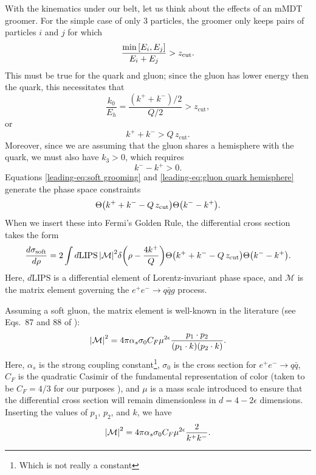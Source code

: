 \documentclass[../thesis.tex]{subfiles}
\providecommand{\zcut}{z_\mathrm{{cut}}}
\providecommand{\LIPS}{\mathrm{LIPS}}
\providecommand{\cM}{\mathcal{M}}
\begin{document}
	With the kinematics under our belt, let us think about the effects of an mMDT groomer. For the simple case of only 3 particles, the groomer only keeps pairs of particles $i$ and $j$ for which \cite{dasgupta_towards_2013,kardos_two-_2020}
	\begin{equation}
		\frac{\min\qty[E_i, E_j]}{E_i + E_j} > \zcut.
	\end{equation}
	This must be true for the quark and gluon; since the gluon has lower energy then the quark, this necessitates that
	\begin{equation}
		\frac{k_0}{E_h} = \frac{(k^+ + k^-)/2}{Q/2} > \zcut,
	\end{equation}
	or
	\begin{equation}\label{leading-eq:soft grooming}
		k^+ + k^- > Q\,\zcut.
	\end{equation}
	Moreover, since we are assuming that the gluon shares a hemisphere with the quark, we must also have $k_3 > 0$, which requires
	\begin{equation}\label{leading-eq:gluon quark hemisphere}
		k^- - k^+ > 0.
	\end{equation}
	Equations \ref{leading-eq:soft grooming} and \ref{leading-eq:gluon quark hemisphere} generate the phase space constraints
	\begin{equation}
		\Theta\qty(k^+ + k^- - Q\,\zcut)\Theta\qty(k^- - k^+).
	\end{equation}
	When we insert these into Fermi's Golden Rule, the differential cross section takes the form
	\begin{equation}\label{leading-eq:soft cross section preliminary}
		\frac{d\sigma_{\text{soft}}}{d\rho} = 2\int d\LIPS\,\abs{\cM}^2 \delta\qty(\rho - \frac{4k^+}{Q}) \Theta\qty(k^+ + k^- - Q\,\zcut)\Theta\qty(k^- - k^+).
	\end{equation}
	Here, $d\LIPS$ is a differential element of Lorentz-invariant phase space, and $\cM$ is the matrix element governing the $e^+ e^- \to q\bar q g$ process.

	Assuming a soft gluon, the matrix element is well-known in the literature (see Eqs.\ 87 and 88 of \cite{catani_infrared_2000}):
	\begin{equation}
		\abs{\cM}^2 = 4\pi \alpha_s \sigma_0 C_F \mu^{2\epsilon} \frac{p_1 \cdot p_2}{(p_1 \cdot k)(p_2 \cdot k)}.
	\end{equation}
	Here, $\alpha_s$ is the strong coupling constant\footnote{Which is not really a constant}, $\sigma_0$ is the cross section for $e^+ e^- \to q\bar q$, $C_F$ is the quadratic Casimir of the fundamental representation of color (taken to be $C_F = 4/3$ for our purposes \cite{particle_data_group_review_2020}), and $\mu$ is a mass scale introduced to ensure that the differential cross section will remain dimensionless in $d = 4 - 2\epsilon$ dimensions. Inserting the values of $p_1$, $p_2$, and $k$, we have
	\begin{equation}\label{leading-eq:soft matrix element}
		\abs{\cM}^2 = 4\pi \alpha_s \sigma_0 C_F \mu^{2\epsilon} \frac{2}{k^+ k^-}.
	\end{equation}
\end{document}
